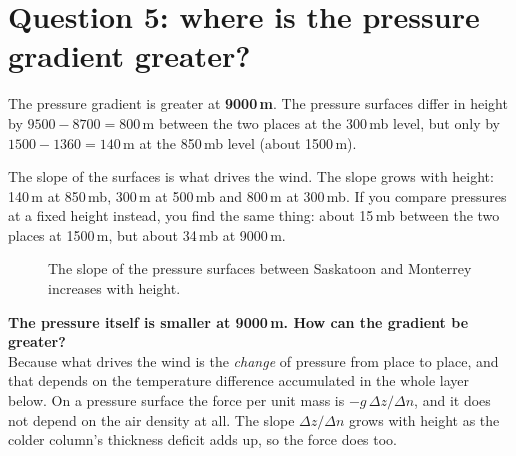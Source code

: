 \section{Question 5: where is the pressure gradient greater?}

\begin{answerbox}
The pressure gradient is greater at \textbf{9000\,m}. The pressure surfaces differ in height by $9500-8700=800$\,m between the two places at the 300\,mb level, but only by $1500-1360=140$\,m at the 850\,mb level (about 1500\,m).
\end{answerbox}

The slope of the surfaces is what drives the wind. The slope grows with height: 140\,m at 850\,mb, 300\,m at 500\,mb and 800\,m at 300\,mb. If you compare pressures at a fixed height instead, you find the same thing: about 15\,mb between the two places at 1500\,m, but about 34\,mb at 9000\,m.

\begin{figure}[ht]
\centering
{}
\caption{The slope of the pressure surfaces between Saskatoon and Monterrey increases with height.}
\end{figure}

\begin{askbox}
\textbf{The pressure itself is smaller at 9000\,m. How can the gradient be greater?}\\
Because what drives the wind is the \emph{change} of pressure from place to place, and that depends on the temperature difference accumulated in the whole layer below. On a pressure surface the force per unit mass is $-g\,\Delta z/\Delta n$, and it does not depend on the air density at all. The slope $\Delta z/\Delta n$ grows with height as the colder column's thickness deficit adds up, so the force does too.
\end{askbox}

